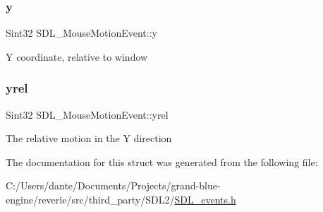 \subsubsection{\texorpdfstring{y}{y}}
{\footnotesize\ttfamily Sint32 S\+D\+L\+\_\+\+Mouse\+Motion\+Event\+::y}

Y coordinate, relative to window \mbox{\label{struct_s_d_l___mouse_motion_event_a7674c8b92d039ab948f671a180fa7b30}} 
\subsubsection{\texorpdfstring{yrel}{yrel}}
{\footnotesize\ttfamily Sint32 S\+D\+L\+\_\+\+Mouse\+Motion\+Event\+::yrel}

The relative motion in the Y direction 

The documentation for this struct was generated from the following file\+:\begin{DoxyCompactItemize}
\item 
C\+:/\+Users/dante/\+Documents/\+Projects/grand-\/blue-\/engine/reverie/src/third\+\_\+party/\+S\+D\+L2/\mbox{\hyperlink{_s_d_l__events_8h}{S\+D\+L\+\_\+events.\+h}}\end{DoxyCompactItemize}
